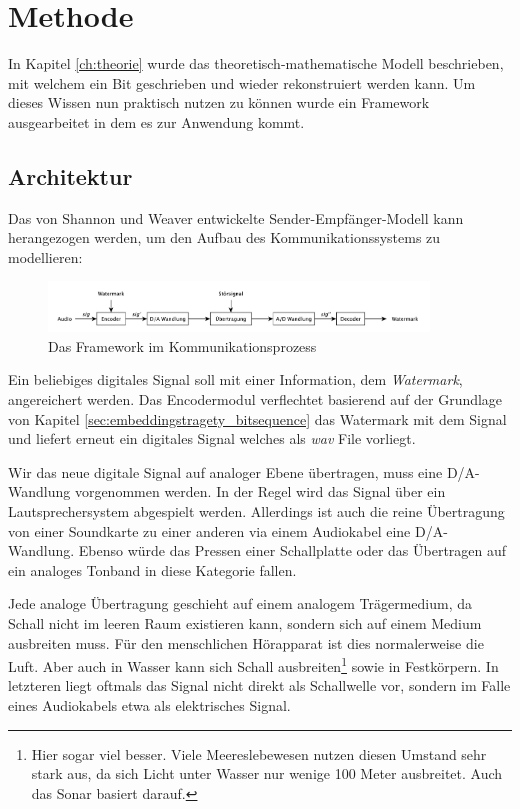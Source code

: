 \chapter{Methode}
\label{ch:methode}

In Kapitel \ref{ch:theorie} wurde das theoretisch-mathematische Modell beschrieben, mit welchem ein Bit geschrieben und wieder rekonstruiert werden kann. Um dieses Wissen nun praktisch nutzen zu können wurde ein Framework ausgearbeitet in dem es zur Anwendung kommt. 

\section{Architektur}

Das von Shannon und Weaver entwickelte Sender-Empfänger-Modell \cite{shannon2001mathematical} kann herangezogen werden, um den Aufbau des Kommunikationssystems zu modellieren:

\begin{figure}[h]
	\centering
	\includegraphics[width=0.9\textwidth]{figures/diagram-framework.pdf}
	\caption{Das Framework im Kommunikationsprozess}
	\label{fig:diagram-framework}
\end{figure}

Ein beliebiges digitales Signal soll mit einer Information, dem \textit{Watermark}, angereichert werden. Das Encodermodul verflechtet basierend auf der Grundlage von Kapitel \ref{sec:embeddingstragety_bitsequence} das Watermark mit dem Signal und liefert erneut ein digitales Signal welches als \textit{wav} File vorliegt.

Wir das neue digitale Signal auf analoger Ebene übertragen, muss eine D/A-Wandlung vorgenommen werden. In der Regel wird das Signal über ein Lautsprechersystem abgespielt werden. Allerdings ist auch die reine Übertragung von einer Soundkarte zu einer anderen via einem Audiokabel eine D/A-Wandlung. Ebenso würde das Pressen einer Schallplatte oder das Übertragen auf ein analoges Tonband in diese Kategorie fallen. 

Jede analoge Übertragung geschieht auf einem analogem Trägermedium, da Schall nicht im leeren Raum existieren kann, sondern sich auf einem Medium ausbreiten muss. Für den menschlichen Hörapparat ist dies normalerweise die Luft. Aber auch in Wasser kann sich Schall ausbreiten\footnote{Hier sogar viel besser. Viele Meereslebewesen nutzen diesen Umstand sehr stark aus, da sich Licht unter Wasser nur wenige 100 Meter ausbreitet. Auch das Sonar basiert darauf.} sowie in Festkörpern. In letzteren liegt oftmals das Signal nicht direkt als Schallwelle vor, sondern im Falle eines Audiokabels etwa als elektrisches Signal. 

